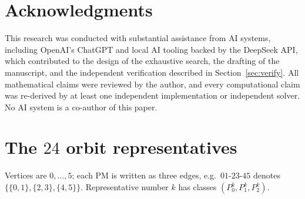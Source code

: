 \documentclass[11pt]{article}
\theoremstyle{definition}
\begin{document}
\section*{Acknowledgments}
This research was conducted with substantial assistance from AI systems,
including OpenAI's ChatGPT and local AI tooling backed by the DeepSeek API,
which contributed to the design of the exhaustive search, the drafting of
the manuscript, and the independent verification described in
Section~\ref{sec:verify}. All mathematical claims were
reviewed by the author, and every computational claim was re-derived by
at least one independent implementation or independent solver. No AI
system is a co-author of this paper.

\appendix

\section{The $24$ orbit representatives}\label{app:reps}

Vertices are $0,\dots,5$; each PM is written as three edges, e.g.\
$01\text{-}23\text{-}45$ denotes $\{\{0,1\},\{2,3\},\{4,5\}\}$.
Representative number $k$ has classes $(P_0^k, P_1^k, P_2^k)$.
\end{document}
